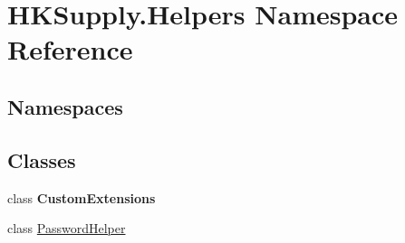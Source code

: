 \hypertarget{namespace_h_k_supply_1_1_helpers}{}\section{H\+K\+Supply.\+Helpers Namespace Reference}
\label{namespace_h_k_supply_1_1_helpers}
\subsection*{Namespaces}
\begin{DoxyCompactItemize}
\end{DoxyCompactItemize}
\subsection*{Classes}
\begin{DoxyCompactItemize}
\item 
class {\bfseries Custom\+Extensions}
\item 
class \hyperlink{class_h_k_supply_1_1_helpers_1_1_password_helper}{Password\+Helper}
\end{DoxyCompactItemize}
